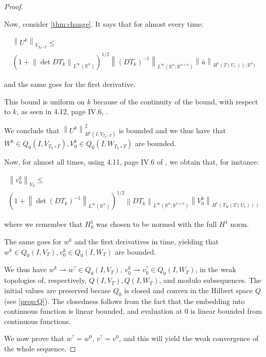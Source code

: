 \documentclass[english,a4paper,12pt,oneside]{scrbook}
\theoremstyle{break}
\newenvironment{mproof}[1][\proofname]{%
  \begin{proof}[#1]$ $\par\nobreak\ignorespaces
}{%
  \end{proof}
}
\renewcommand*{\proofname}{Proof}
\theoremstyle{remark}
\newcommand{\mR}{\mathbb{R}}
\newcommand{\norm}[1]{\left\lVert#1\right\rVert}
\newcommand{\te}{\theta}
\newcommand{\weakc}{\rightharpoonup}
\begin{document}
\begin{mproof}
Now, consider \ref{thm:change}. It says that for almost every time:

\begin{align*}
\norm{U^k}_{V_{T_k\circ T}}\leq\\ \left ( 1+\norm{\det DT_k}_{L^\infty(\mR^n)}\right)^{1/2} \norm{(DT_k)^{-1}}_{L^\infty(\mR^n;\mR^{n\times n})}\norm{\bar{u}}_{H^1(T(U_r));\mR^n)}
\end{align*}

and the same goes for the first derivative. 



This bound is uniform on $k$ because of the continuity of the bound, with respect to $k$, as seen in 4.12, page IV.6, \cite{murat}.

We conclude that $\norm{U^k}_{H^1(I,V_{T_k\circ T})}^2$ is bounded and we thus have that $W^k \in Q_0(I, V_{T_k\circ T}), V_0^k \in Q_0(I,W_{T_k\circ T})$ are bounded.

Now, for almost all times, using 4.11, page IV.6 of \cite{murat}, we obtain that, for instance:

\begin{align*}
\norm{v_0^k}_{V_{ T}}\leq \\\left ( 1+\norm{\det (DT_k)^{-1}}_{L^\infty(\mR^n)}\right)^{1/2} \norm{DT_k}_{L^\infty(\mR^n;\mR^{n\times n})}\norm{V_0^k}_{H^1(T_K(T(U_r)))}
\end{align*}

where we remember that $H^1_0$ was chosen to be normed with the full $H^1$ norm.

The same goes for $w^k$ and the first derivatives in time, yielding that $w^k \in Q_0(I, V_{ T}), v_0^k \in Q_0(I,W_{T})$ are bounded.

We thus have $w^k\weakc w^? \in Q_0(I, V_{ T})$, $v_0^k \weakc v_0^? \in Q_0(I,W_{T})$, in the weak topologies of, respectively, $Q(I, V_{ T}), Q(I,W_{T})$, and modulo subsequences. The initial values are preserved becase $Q_0$ is closed and convex in the Hilbert space $Q$ (see \ref{prop:Q}). The closedness follows from the fact that the embedding into continuous function is linear bounded, and evaluation at $0$ is linear bounded from continuous functions.

We now prove that $w^?=w^0$, $v^?=v^0$, and this will yield the weak convergence of the whole sequence.


\end{mproof}
\end{document}
